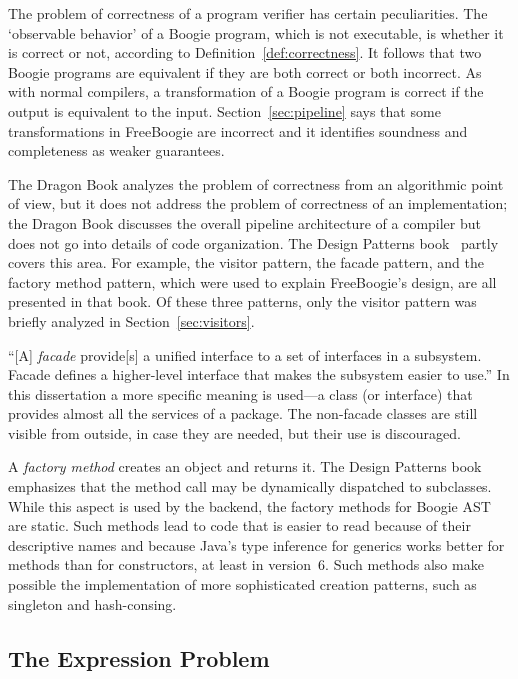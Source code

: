\documentclass{llncs}
\begin{document}
The problem of correctness of a program verifier has certain
peculiarities. The `observable behavior' of a Boogie program,
which is not executable, is whether it is correct or not,
according to Definition~\ref{def:correctness}. It follows that
two Boogie programs are equivalent if they are both correct or
both incorrect. As with normal compilers, a transformation of
a Boogie program is correct if the output is equivalent to the
input. Section~\ref{sec:pipeline} says that some transformations
in FreeBoogie are incorrect and it identifies soundness and
completeness as weaker guarantees.

The Dragon Book analyzes the problem of correctness from an
algorithmic point of view, but it does not address the problem
of correctness of an implementation; the Dragon Book discusses
the overall pipeline architecture of a compiler but does not
go into details of code organization. The Design Patterns
book~\cite{gamma1995} partly covers this area. For example, the
visitor pattern, the facade pattern, and the factory method
pattern, which were used to explain FreeBoogie's design, are all
presented in that book. Of these three patterns, only the visitor
pattern was briefly analyzed in Section~\ref{sec:visitors}.

``[A] \emph{facade} provide[s] a unified interface to a set
of interfaces in a subsystem. Facade defines a higher-level
interface that makes the subsystem easier to use.'' In this
dissertation a more specific meaning is used---a class (or
interface) that provides almost all the services of a package.
The non-facade classes are still visible from outside, in case
they are needed, but their use is discouraged.

A \emph{factory method} creates an object and returns it. The
Design Patterns book emphasizes that the method call may be
dynamically dispatched to subclasses. While this aspect is used
by the backend, the factory methods for Boogie AST are static.
Such methods lead to code that is easier to read because of their
descriptive names and because Java's type inference for generics
works better for methods than for constructors, at least in
version~6. Such methods also make possible the implementation
of more sophisticated creation patterns, such as singleton and
hash-consing.

\subsection{The Expression Problem}
\end{document}

